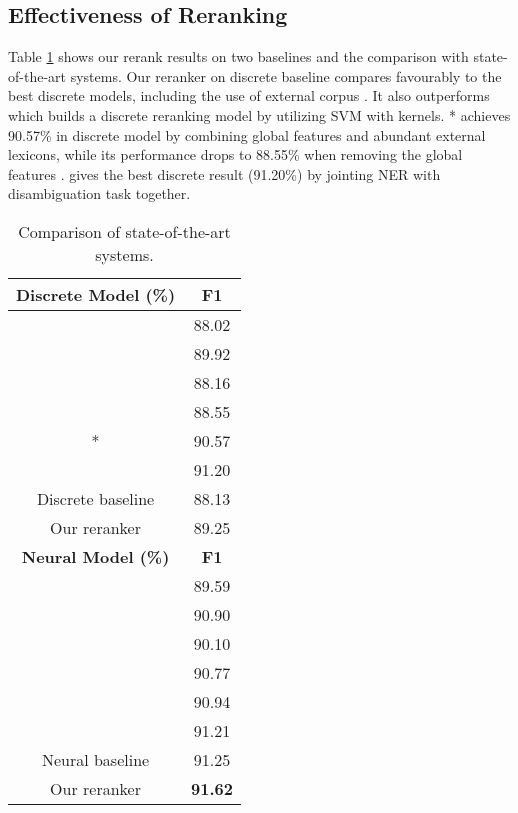\documentclass[11pt,a4paper]{article}
\begin{document}
\subsection{Effectiveness of Reranking}
Table \ref{tab:bestresult} shows our rerank results on two baselines and the comparison with state-of-the-art systems. Our reranker on discrete baseline compares favourably to the best discrete models, including the use of external corpus \cite{kazama2007exploiting,suzuki2008semi}. It also outperforms \citet{nguyen2010kernel} which builds a discrete reranking model by utilizing SVM with kernels. \citet{ratinov2009design}* achieves 90.57\% in discrete model by combining global features and abundant external lexicons, while its performance drops to 88.55\% when removing the global features \cite{ratinov2009design}. \citet{luo2015joint} gives the best discrete result (91.20\%) by jointing NER with disambiguation task together. 

\begin{table}[t]
\begin{center}
\begin{tabular}{|c|c|}
\hline 
\bf Discrete Model (\%)& \bf F1 \\
\hline
\citet{kazama2007exploiting}&88.02\\ 
\citet{suzuki2008semi}&89.92\\ 
\citet{nguyen2010kernel}&88.16 \\ 
\citet{ratinov2009design}&88.55 \\
\citet{ratinov2009design}*&90.57\\  
\citet{luo2015joint} & 91.20 \\
\hline
Discrete baseline&  88.13 \\ 
Our reranker&  89.25 \\
\hline
\hline
\bf Neural Model (\%)& \bf F1 \\ 
\hline
\citet{collobert2011natural}&89.59 \\
\citet{passos2014lexicon} & 90.90 \\
\citet{huang2015bidirectional}& 90.10 \\
\citet{chiu2015named} & 90.77 \\
\citet{lample2016neural} & 90.94\\
\citet{ma2016end} & 91.21\\
\hline
Neural baseline&  91.25\\
Our reranker&  \bf91.62\\
\hline
\end{tabular}
\end{center}
\caption{Comparison of state-of-the-art systems.}
\label{tab:bestresult}
\end{table}
\end{document}
